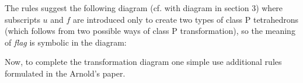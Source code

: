 \documentclass[a4paper,12pt]{amsart}
\numberwithin{equation}{section}
\begin{document}
The rules suggest the following diagram (cf. with diagram in section 3) where subscripts $u$ and $f$ are introduced only to create two types of class P tetrahedrons (which follows from two possible ways of class P transformation), so the meaning of \textit{flag} is symbolic in the diagram:

\begin{center}
\end{center}

Now, to complete the transformation diagram one simple use additional rules formulated in the Arnold's paper.
\end{document}
